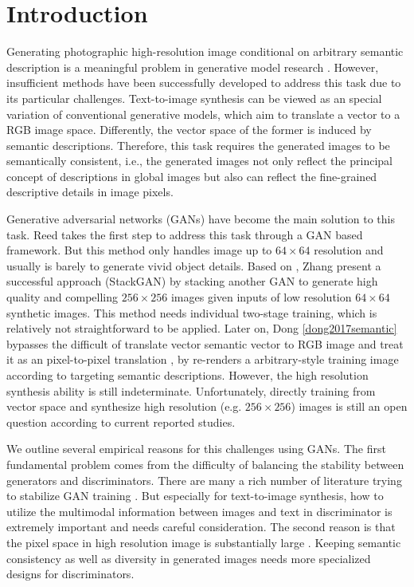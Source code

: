 \documentclass[10pt,twocolumn,letterpaper]{article}
\begin{document}
\section{Introduction}
Generating photographic high-resolution image conditional on arbitrary semantic description is a meaningful problem in generative model research \cite{reed2016generative}. However, insufficient methods have been successfully developed to address this task due to its particular challenges. Text-to-image synthesis can be viewed as an special variation of conventional generative models, which aim to translate a vector to a RGB image space.  Differently, the vector space of the former is induced by semantic descriptions. Therefore, this task requires the generated images to be semantically consistent, i.e., the generated images not only reflect the principal concept of descriptions in global images but also can reflect the fine-grained descriptive details in image pixels. 

Generative adversarial networks (GANs) have become the main solution to this task. 
Reed \etal \cite{reed2016generative} takes the first step to address this task through a GAN based framework. But this method only handles image up to $64{\times}64$ resolution and usually is barely to generate vivid object details.
Based on \cite{reed2016generative}, Zhang \etal \cite{han2017stackganan} present a successful approach (StackGAN) by stacking another GAN to generate high quality and compelling $256{\times}256$ images given inputs of low resolution $64{\times}64$ synthetic images. This method needs individual two-stage training, which is relatively not straightforward to be applied. Later on, Dong \etal \ref{dong2017semantic} 
bypasses the difficult of translate vector semantic vector to RGB image and treat it as an pixel-to-pixel translation \cite{isola2016image}, by re-renders a arbitrary-style training image according to targeting semantic descriptions. However, the high resolution synthesis ability is still indeterminate. 
Unfortunately, directly training from vector space and synthesize high resolution (e.g. $256{\times}256$)  images is still an open question according to current reported studies. 

We outline several empirical reasons for this challenges using GANs. The first fundamental problem comes from the difficulty of balancing the stability between generators and discriminators. There are many a rich number of literature trying to stabilize GAN training \cite{salimans2016improved}. But especially for text-to-image synthesis, how to utilize the multimodal information between images and text in discriminator is extremely important and needs careful consideration. The second reason is that the pixel space in high resolution image is substantially large \cite{han2017stackgan}. Keeping semantic consistency as well as diversity in generated images needs more specialized designs for discriminators. 
\end{document}
